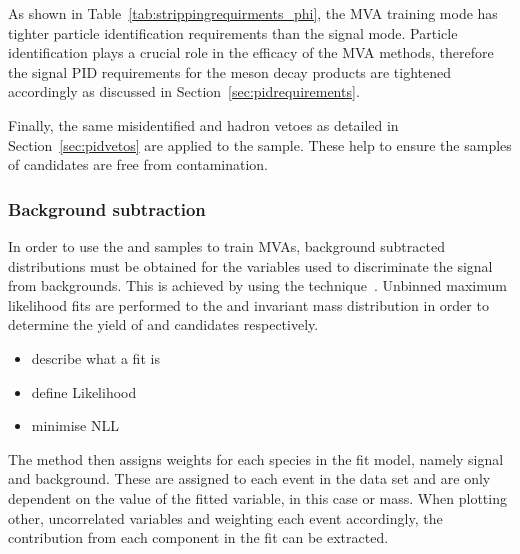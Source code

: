As shown in Table~\ref{tab:strippingrequirments_phi}, the MVA training mode has tighter particle identification requirements than the signal mode. Particle identification plays a crucial role in the efficacy of the MVA methods, therefore the signal PID requirements for the \phiz meson decay products are tightened accordingly as discussed in Section~\ref{sec:pidrequirements}.

Finally, the same misidentified \D and \Lc hadron vetoes as detailed in Section~\ref{sec:pidvetos} are applied to the \decay{\Bsb}{\Dsp\pim} sample. These help to ensure the samples of \Dsp candidates are free from contamination.


\subsubsection{Background subtraction}

In order to use the \decay{\Bs}{\jpsi\phiz} and \decay{\Bsb}{\Dsp\pim} samples to train MVAs, background subtracted distributions must be obtained for the variables used to discriminate the signal from backgrounds. This is achieved by using the \sPlot technique~\cite{Pivk:2004ty}. Unbinned maximum likelihood fits are performed to the \Dsp and \phiz invariant mass distribution in order to determine the yield of \Dsp and \phiz candidates respectively. 

{\color{Red}
\begin{itemize}
\item describe what a fit is
\item define Likelihood
\item minimise NLL 
\end{itemize}
}


The \sPlot method then assigns weights for each species in the fit model, namely signal and background. These are assigned to each event in the data set and are only dependent on the value of the fitted variable, in this case \phiz or \Dsp mass. When plotting other, uncorrelated variables and weighting each event accordingly, the contribution from each component in the fit can be extracted. 

